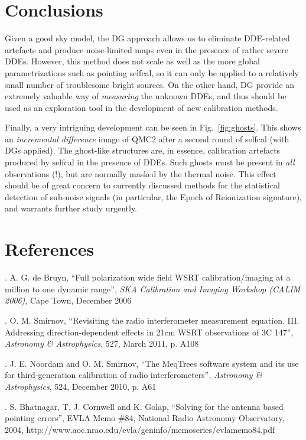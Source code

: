 \documentclass{aps2010} \special{papersize=8.5in,11in}
\begin{document}
\section{Conclusions}

\noindent Given a good sky model, the DG approach allows us to eliminate DDE-related artefacts and produce noise-limited maps even in the presence of rather severe DDEs. However, this method does not scale as well as the more global parametrizations such as pointing selfcal, so it can only be applied to a relatively small number of troublesome bright sources. On the other hand, DG provide an extremely valuable way of \emph{measuring}\/ the unknown DDEs, and thus should be used as an exploration tool in the development of new calibration methods.

Finally, a very intriguing development can be seen in Fig.~\ref{fig:ghosts}. This shows an \emph{incremental difference\/} image of QMC2 after a second round of selfcal (with DGs applied). The ghost-like structures are, in essence, calibration artefacts produced by selfcal in the presence of DDEs. Such ghosts must be present in \emph{all} observations (!), but are normally masked by the thermal noise. This effect should be of great concern to currently discussed methods for the statistical detection of sub-noise signals (in particular, the Epoch of Reionization signature), and warrants further study urgently.

\section{References}

. A. G. de Bruyn, ``Full polarization wide field WSRT calibration/imaging at a million to one dynamic range'', 
\emph{SKA Calibration and Imaging Workshop (CALIM 2006)}, Cape Town, December 2006

. O. M. Smirnov, ``Revisiting the radio interferometer measurement equation. III. Addressing direction-dependent effects in 21cm WSRT observations of 3C 147'',
\emph{Astronomy \& Astrophysics}, 527, March 2011, p. A108

. J. E. Noordam and O. M. Smirnov, ``The MeqTrees software system and its use for third-generation calibration of radio interferometers'',
\emph{Astronomy \& Astrophysics}, 524, December 2010, p. A61

. S. Bhatnagar, T. J. Cornwell and K. Golap, ``Solving for the antenna based pointing errors'', EVLA Memo \#84, National Radio Astronomy Observatory, 2004, http://www.aoc.nrao.edu/evla/geninfo/memoseries/evlamemo84.pdf
\end{document}
